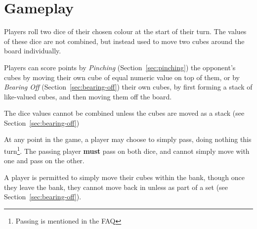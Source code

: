 \section{Gameplay}
Players roll two dice of their chosen colour at the start of their turn.
The values of these dice are not combined, but instead used to move two cubes around the board individually.

Players can score points by \textit{Pinching} (Section~\ref{sec:pinching}) the opponent's cubes by moving their own cube of equal numeric value on top of them, or by \textit{Bearing Off} (Section~\ref{sec:bearing-off}) their own cubes, by first forming a stack of like-valued cubes, and then moving them off the board.

\note The dice values cannot be combined unless the cubes are moved as a stack (see Section~\ref{sec:bearing-off})

\note At any point in the game, a player may choose to simply pass, doing nothing this turn\footnote{Passing is mentioned in the FAQ}.
The passing player \textbf{must} pass on both dice, and cannot simply move with one and pass on the other.

\note A player is permitted to simply move their cubes within the bank, though once they leave the bank, they cannot move back in unless as part of a set (see Section~\ref{sec:bearing-off}).





